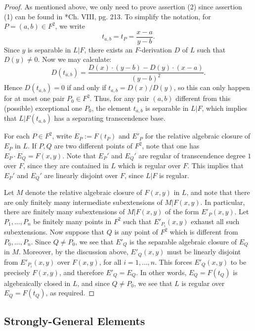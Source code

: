 \documentclass[11pt]{amsart}
\theoremstyle{definition}
\theoremstyle{remark}
\numberwithin{equation}{section}
\begin{document}
\begin{proof}
  As mentioned above, we only need to prove assertion (2) since assertion (1) can be found in \cite{Lang:1958}*{Ch. VIII, pg. 213}.
  To simplify the notation, for $P = (a,b) \in F^2$, we write
  \[ t_{a,b} = t_P = \frac{x-a}{y-b}. \]
  Since $y$ is separable in $L|F$, there exists an $F$-derivation $D$ of $L$ such that $D(y) \neq 0$.
  Now we may calculate:
  \[ D(t_{a,b}) = \frac{D(x) \cdot (y-b) - D(y) \cdot (x-a)}{(y-b)^2}. \]
  Hence $D(t_{a,b}) = 0$ if and only if $t_{a,b} = D(x)/D(y)$, so this can only happen for at most one pair $P_0 \in F^2$.
  Thus, for any pair $(a,b)$ different from this (possible) exceptional one $P_0$, the element $t_{a,b}$ is separable in $L|F$, which implies that $L|F(t_{a,b})$ has a separating transcendence base.

  For each $P \in F^2$, write $E_P := F(t_P)$ and $E'_P$ for the relative algebraic closure of $E_P$ in $L$.
  If $P,Q$ are two different points of $F^2$, note that one has $E_P \cdot E_Q = F(x,y)$.
  Note that $E_P'$ and $E_Q'$ are regular of transcendence degree $1$ over $F$, since they are contained in $L$ which is regular over $F$.
  This implies that $E_P'$ and $E_Q'$ are linearly disjoint over $F$, since $L|F$ is regular.

  Let $M$ denote the relative algebraic closure of $F(x,y)$ in $L$, and note that there are only finitely many intermediate subextensions of $M|F(x,y)$.
  In particular, there are finitely many subextensions of $M|F(x,y)$ of the form $E'_P(x,y)$.
  Let $P_1,\ldots,P_n$ be finitely many points in $F^2$ such that $E'_{P_i}(x,y)$ exhaust all such subextensions.
  Now suppose that $Q$ is any point of $F^2$ which is different from $P_0,\ldots,P_n$.
  Since $Q \neq P_0$, we see that $E'_Q$ is the separable algebraic closure of $E_Q$ in $M$.
  Moreover, by the discussion above, $E'_Q(x,y)$ must be linearly disjoint from $E'_{P_i}(x,y)$ over $F(x,y)$, for all $i = 1,\ldots,n$.
  This forces $E'_Q(x,y)$ to be precisely $F(x,y)$, and therefore $E'_Q = E_Q$.
  In other words, $E_Q = F(t_Q)$ is algebraically closed in $L$, and since $Q \neq P_0$, we see that $L$ is regular over $E_Q = F(t_Q)$, as required.
\end{proof}

\subsection{Strongly-General Elements}
\label{subsection: strgen / strgen}
\end{document}
